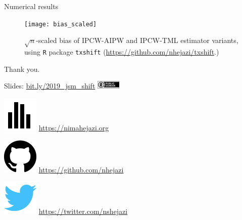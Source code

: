 \documentclass{beamer}
\begin{document}

\begin{frame}[c]{Numerical results}

\vspace{-2em}
\begin{figure}[H]
  \centering
  \texttt{[image: bias\_scaled]}
  \caption{
    $\sqrt{n}$-scaled bias of IPCW-AIPW and IPCW-TML estimator variants, using
    \texttt{R} package \texttt{txshift}
    (\url{https://github.com/nhejazi/txshift}.)
  }
\end{figure}

\note{
}

\end{frame}


\setbeamercovered{}
\beamerdefaultoverlayspecification{}

\begin{frame}[c,allowframebreaks]{}

\scriptsize



\end{frame}


\begin{frame}[c]{Thank you.}

\large
Slides: \href{bit.ly/2019\_jsm\_shift}{bit.ly/2019\_jsm\_shift}
  \quad
\includegraphics[height=4mm]{Figs/cc-zero.png}

\vspace{2mm}
\includegraphics[scale=0.14]{homepage.png} \url{https://nimahejazi.org}

\vspace{2mm}
\includegraphics[scale=0.11]{github-icon.png}
  \url{https://github.com/nhejazi}

\vspace{2mm}
\includegraphics[scale=0.14]{twitter-icon.png}
  \url{https://twitter.com/nshejazi}

\end{frame}

\end{document}
